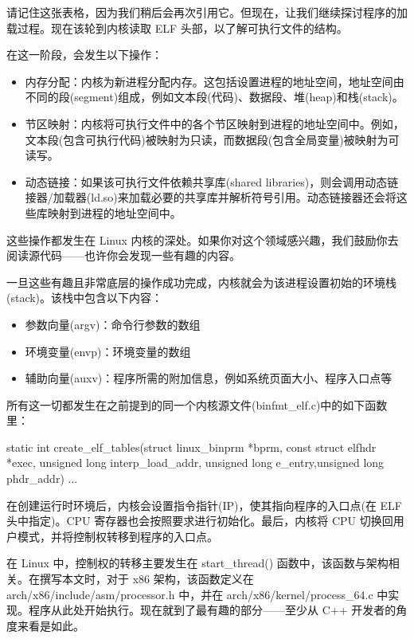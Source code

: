 请记住这张表格，因为我们稍后会再次引用它。但现在，让我们继续探讨程序的加载过程。现在该轮到内核读取 ELF 头部，以了解可执行文件的结构。

在这一阶段，会发生以下操作：

\begin{itemize}
\item 
内存分配：内核为新进程分配内存。这包括设置进程的地址空间，地址空间由不同的段(segment)组成，例如文本段(代码)、数据段、堆(heap)和栈(stack)。

\item 
节区映射：内核将可执行文件中的各个节区映射到进程的地址空间中。例如，文本段(包含可执行代码)被映射为只读，而数据段(包含全局变量)被映射为可读写。

\item 
动态链接：如果该可执行文件依赖共享库(shared libraries)，则会调用动态链接器/加载器(ld.so)来加载必要的共享库并解析符号引用。动态链接器还会将这些库映射到进程的地址空间中。
\end{itemize}

这些操作都发生在 Linux 内核的深处。如果你对这个领域感兴趣，我们鼓励你去阅读源代码——也许你会发现一些有趣的内容。

一旦这些有趣且非常底层的操作成功完成，内核就会为该进程设置初始的环境栈(stack)。该栈中包含以下内容：

\begin{itemize}
\item 
参数向量(argv)：命令行参数的数组

\item 
环境变量(envp)：环境变量的数组

\item 
辅助向量(auxv)：程序所需的附加信息，例如系统页面大小、程序入口点等
\end{itemize}

所有这一切都发生在之前提到的同一个内核源文件(binfmt\_elf.c)中的如下函数里：

\begin{cpp}
static int create_elf_tables(struct linux_binprm *bprm,
const struct elfhdr *exec, unsigned long interp_load_addr,
unsigned long e_entry,unsigned long phdr_addr) { ... }
\end{cpp}

在创建运行时环境后，内核会设置指令指针(IP)，使其指向程序的入口点(在 ELF 头中指定)。CPU 寄存器也会按照要求进行初始化。最后，内核将 CPU 切换回用户模式，并将控制权转移到程序的入口点。

在 Linux 中，控制权的转移主要发生在 start\_thread() 函数中，该函数与架构相关。在撰写本文时，对于 x86 架构，该函数定义在 arch/x86/include/asm/processor.h 中，并在 arch/x86/kernel/process\_64.c 中实现。程序从此处开始执行。现在就到了最有趣的部分——至少从 C++ 开发者的角度来看是如此。

